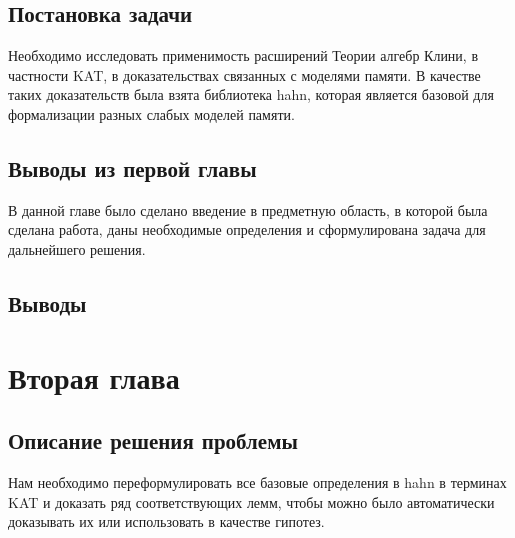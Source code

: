 \documentclass[times
              ]{itmo-student-thesis}
\begin{document}


  \section{Постановка задачи}
    Необходимо исследовать применимость расширений Теории алгебр Клини, в частности KAT, в доказательствах связанных с моделями памяти.
    В качестве таких доказательств была взята библиотека hahn, которая является базовой для формализации разных слабых моделей памяти.

  \section{Выводы из первой главы}
    В данной главе было сделано введение в предметную область, в которой была сделана работа, даны необходимые определения и сформулирована задача для дальнейшего решения.
  \section{Выводы}
 \chapter{Вторая глава}



   \section{Описание решения проблемы}

   Нам необходимо переформулировать все базовые определения в hahn в терминах KAT и доказать ряд соответствующих лемм, чтобы можно было автоматически доказывать их или использовать в качестве гипотез.
\end{document}
